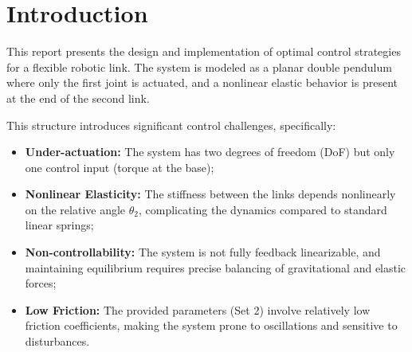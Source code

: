 

\section*{Introduction}

This report presents the design and implementation of optimal control strategies for a flexible robotic link.
The system is modeled as a planar double pendulum where only the first joint is actuated, and a nonlinear elastic behavior is present at the end of the second link.

This structure introduces significant control challenges, specifically:
\begin{itemize}
    \item \textbf{Under-actuation:} The system has two degrees of freedom (DoF) but only one control input (torque at the base);
    \item \textbf{Nonlinear Elasticity:} The stiffness between the links depends nonlinearly on the relative angle $\theta_2$, complicating the dynamics compared to standard linear springs;
    \item \textbf{Non-controllability:} The system is not fully feedback linearizable, and maintaining equilibrium requires precise balancing of gravitational and elastic forces;
    \item \textbf{Low Friction:} The provided parameters (Set 2) involve relatively low friction coefficients, making the system prone to oscillations and sensitive to disturbances.
\end{itemize}


\newpage